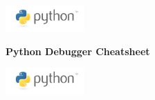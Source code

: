 \documentclass[10pt,landscape,a4paper]{article}
\begin{document}
  \begin{center}
    \begin{minipage}[c]{0.15\textwidth}
      \includegraphics[width=3cm]{python-logo}
    \end{minipage}
    \begin{minipage}[c]{0.43\textwidth}
      \huge \bfseries Python Debugger Cheatsheet
    \end{minipage}
    \begin{minipage}[r]{0.15\textwidth}
      \includegraphics[width=3cm]{python-logo}
    \end{minipage}
    \vspace{1cm}
  \end{center}
\end{document}
